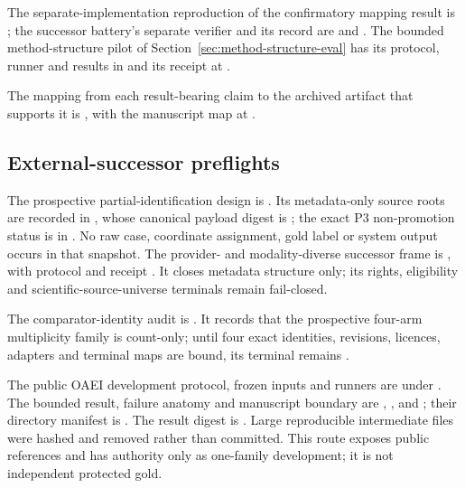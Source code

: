 The separate-implementation reproduction of the confirmatory mapping result is
; the
successor battery's separate verifier and its record are
 and
. The
bounded method-structure pilot of
Section~\ref{sec:method-structure-eval} has its protocol, runner and results
in  and its receipt at
.

The mapping from each result-bearing claim to the archived artifact that
supports it is , with the manuscript map at
.

\subsection{External-successor preflights}

The prospective partial-identification design is
. Its metadata-only
source roots are recorded in
,
whose canonical payload digest is
;
the exact P3 non-promotion status is in
.
No raw case, coordinate assignment, gold label or system output occurs in that
snapshot.
The provider- and modality-diverse successor frame is
,
with protocol
and receipt
.
It closes metadata structure only; its
rights, eligibility and scientific-source-universe terminals remain fail-closed.

The comparator-identity audit is
.
It records that the prospective four-arm multiplicity family is count-only;
until four exact identities, revisions, licences, adapters and terminal maps are
bound, its terminal remains
.

The public OAEI development protocol, frozen inputs and runners are under
.  The
bounded result, failure anatomy and manuscript boundary are
, ,  and
; their directory manifest is
.  The result digest is
.
Large reproducible intermediate files were hashed and removed rather than
committed.  This route exposes public references and has authority only as
one-family development; it is not independent protected gold.


